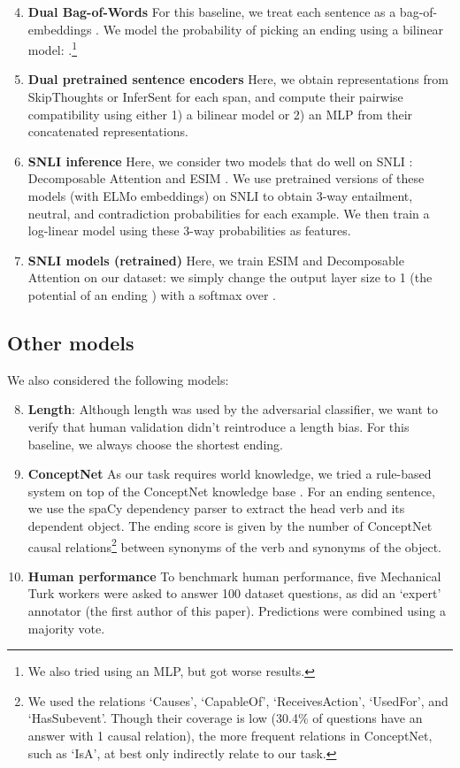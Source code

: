 \documentclass[11pt,a4paper]{article}
\begin{document}
\begin{enumerate}[wide, labelwidth=!,labelindent=0pt,noitemsep,topsep=0pt,label=\textbf{\alph*}.]
\setcounter{enumi}{3}
\item {\bf Dual Bag-of-Words} For this baseline, we treat each sentence as a bag-of-embeddings . We model the probability of picking an ending  using a bilinear model: .\footnote{We also tried using an MLP, but got worse results.}
\item {\bf Dual pretrained sentence encoders} Here, we obtain representations from SkipThoughts or InferSent for each span, and compute their pairwise compatibility using either 1) a bilinear model or 2) an MLP from their concatenated representations.
\item {\bf SNLI inference} Here, we consider two models that do well on SNLI \cite{bowman2015snli}: Decomposable Attention \cite{parikh2016decomposable} and ESIM \cite{chen2017enhanced}. 
We use pretrained versions of these models (with ELMo embeddings) on SNLI to obtain 3-way entailment, neutral, and contradiction probabilities for each example. We then train a log-linear model using these 3-way probabilities as features.
\item {\bf SNLI models (retrained)} Here, we train ESIM and Decomposable Attention on our dataset: we simply change the output layer size to 1 (the potential of an ending ) with a softmax over .
\end{enumerate}

\subsection{Other models}
We also considered the following models:
\begin{enumerate}[wide, labelwidth=!,labelindent=0pt,noitemsep,topsep=0pt,label=\textbf{\alph*}.]
\setcounter{enumi}{7}
\item {\bf Length}: Although length was used by the adversarial classifier, we want to verify that human validation didn't reintroduce a length bias. For this baseline, we always choose the shortest ending.
\item {\bf ConceptNet} As our task requires world knowledge, we tried a rule-based system on top of the ConceptNet knowledge base \cite{speer2017conceptnet}. For an ending sentence, we use the spaCy dependency parser to extract the head verb and its dependent object. The ending score is given by the number of ConceptNet causal relations\footnote{We used the relations `Causes', `CapableOf', `ReceivesAction', `UsedFor', and `HasSubevent'. Though their coverage is low (30.4\% of questions have an answer with 1 causal relation), the more frequent relations in ConceptNet, such as `IsA', at best only indirectly relate to our task.} between synonyms of the verb and synonyms of the object. 
\item {\bf Human performance} To benchmark human performance, five Mechanical Turk workers were asked to answer 100 dataset questions, as did an `expert' annotator (the first author of this paper). Predictions were combined using a majority vote. \end{enumerate}
\end{document}
